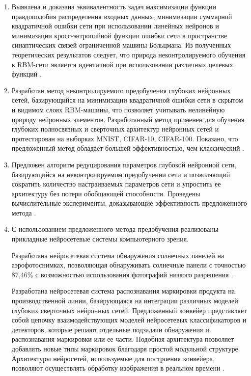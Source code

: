 \begin{enumerate}[wide, labelindent=10mm]

\item Выявлена и доказана эквивалентность задач максимизации функции правдоподобия распределения входных данных, минимизации суммарной квадратичной ошибки сети при использовании линейных нейронов и минимизации кросс-энтропийной функции ошибки сети в пространстве синаптических связей ограниченной машины Больцмана. Из полученных теоретических результатов следует, что природа неконтролируемого обучения в RBM-сети является идентичной при использовании различных целевых функций \cite{2-A, 4-A, 5-A, 10-A, 3-A, 12-A, 13-A}.
\item Разработан метод неконтролируемого предобучения глубоких нейронных сетей, базирующийся на минимизации квадратичной ошибки сети в скрытом и видимом слоях RBM-машины, что позволяет учитывать нелинейную природу нейронных элементов. Разработанный метод применен для обучения глубоких полносвязных и сверточных архитектур нейронных сетей и протестирован на выборках MNIST, CIFAR-10, CIFAR-100. Показано, что предложенный метод обладает большей эффективностью, чем классический \cite{2-A, 4-A, 5-A, 10-A, 3-A, 1-A, 12-A, 13-A, 17-A, 18-A, 19-A, 20-A, 21-A, 22-A}.
\item Предложен алгоритм редуцирования параметров глубокой нейронной сети, базирующийся на неконтролируемом предобучении сети и позволяющий сократить количество настраиваемых параметров сети и упростить ее архитектуру без потери обобщающей способности. Проведены вычислительные эксперименты, доказывающие эффективность предложенного метода \cite{11-A, 16-A, 30-A}.
\item С использованием предложенного метода предобучения реализованы прикладные нейросетевые системы компьютерного зрения. 

Разработана нейросетевая система обнаружения солнечных панелей на аэрофотоснимках, позволяющая обнаруживать солнечные панели с точностью 87,46\% с возможностью использования фотографий низкого разрешения \cite{9-A, 14-A, 15-A}.

Разработана нейросетевая система распознавания маркировки продукта на производственной линии, базирующаяся на интеграции различных моделей глубоких сверточных нейронных сетей. Предложенный конвейер представляет собой цепочку взаимодействующих моделей нейросетевых классификаторов и детекторов, которые решают отдельные подзадачи обнаружения и распознавания маркировки или ее части. Подобная архитектура позволяет добавлять новые типы маркировок благодаря простой модульной структуре. Архитектуры нейросетей, используемые для построения конвейера, позволяют осуществлять обработку изображения в реальном времени \cite{6-A, 7-A, 8-A, 23-A, 24-A, 25-A, 26-A, 27-A, 28-A, 29-A}.


\end{enumerate}
